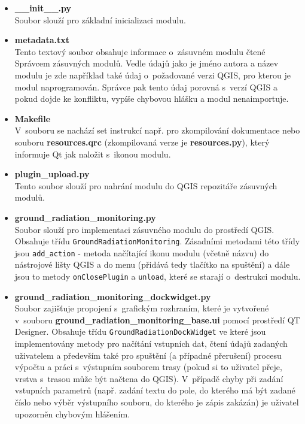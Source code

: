 \begin{itemize}
	\item \textbf{\_\_init\_\_.py} \\ Soubor slouží pro základní
inicializaci modulu.
		 
	\item \textbf{metadata.txt} \\ Tento textový soubor obsahuje
informace o~zásuvném modulu čtené Správcem zásuvných modulů. Vedle
údajů jako je jméno autora a název modulu je zde například také údaj
o~požadované verzi QGIS, pro kterou je modul naprogramován. Správce
pak tento údaj porovná s~verzí QGIS a pokud dojde ke konfliktu, vypíše
chybovou hlášku a modul nenaimportuje.
	
	\item \textbf{Makefile} \\ V~souboru se nachází set instrukcí
např. pro zkompilování dokumentace nebo souboru \textbf{resources.qrc}
(zkompilovaná verze je \textbf{resources.py}), který informuje Qt jak
naložit s~ikonou modulu.
		
	\item \textbf{plugin\_upload.py} \\ Tento soubor slouží pro
nahrání modulu do QGIS repozitáře zásuvných modulů.

	\item \textbf{ground\_radiation\_monitoring.py} \\ Soubor
slouží pro implementaci zásuvného modulu do prostředí QGIS. Obsahuje
třídu \texttt{GroundRadiationMonitoring}. Zásadními metodami této
třídy jsou \texttt{add\_action} - metoda načítající ikonu modulu
(včetně názvu) do nástrojové lišty QGIS a do menu (přidává tedy
tlačítko na spuštění) a dále jsou to metody \texttt{onClosePlugin} a
\texttt{unload}, které se starají o~destrukci modulu.

	\item \textbf{ground\_radiation\_monitoring\_dockwidget.py} \\
Soubor zajišťuje propojení s~grafickým rozhraním, které je vytvořené
v~souboru \textbf{ground\_radiation\_monitoring\_base.ui} pomocí
prostředí QT Designer. Obsahuje třídu
\texttt{GroundRadiationDockWidget} ve které jsou implementovány metody
pro načítání vstupních dat, čtení údajů zadaných uživatelem a
především také pro spuštění (a případné přerušení) procesu výpočtu a
práci s~výstupním souborem trasy (pokud si to uživatel přeje, vrstva
s~trasou může být načtena do QGIS). V~případě chyby při zadání
vstupních parametrů (např. zadání textu do pole, do kterého má být
zadané číslo nebo výběr výstupního souboru, do kterého je zápis
zakázán) je uživatel upozorněn chybovým hlášením.
	

\end{itemize}
